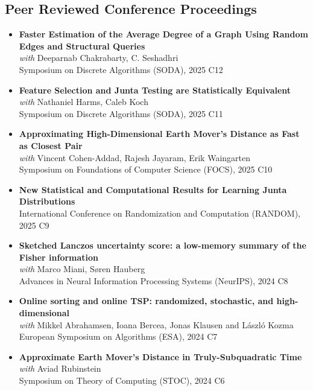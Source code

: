 \documentclass[paper=a4,fontsize=11pt]{article} %
\begin{document}
\subsection*{Peer Reviewed Conference Proceedings}
\begin{itemize}[leftmargin=0.5em,itemsep=0.3em,label={}]
    \item \textbf{Faster Estimation of the Average Degree of a Graph Using Random Edges and Structural Queries}\\ 
  \textit{with} Deeparnab Chakrabarty, C. Seshadhri \\
  Symposium on Discrete Algorithms (SODA), 2025 \hfill C12

    \item \textbf{Feature Selection and Junta Testing are Statistically Equivalent}\\ 
  \textit{with} Nathaniel Harms, Caleb Koch  \\
  Symposium on Discrete Algorithms (SODA), 2025 \hfill C11

    \item \textbf{Approximating High-Dimensional Earth Mover's Distance as Fast as Closest Pair}\\ 
  \textit{with} Vincent Cohen-Addad, Rajesh Jayaram, Erik Waingarten \\
    Symposium on Foundations of Computer Science (FOCS), 2025 \hfill C10
    
    \item \textbf{New Statistical and Computational Results for Learning Junta Distributions}\\ 
    International Conference on Randomization and Computation (RANDOM), 2025 \hfill C9
    
    \item \textbf{Sketched Lanczos uncertainty score: a low-memory summary of the Fisher information}\\ 
  \textit{with} Marco Miani, Søren Hauberg \\
    Advances in Neural Information Processing Systems (NeurIPS), 2024 \hfill C8

    \item \textbf{Online sorting and online TSP: randomized, stochastic, and high-dimensional}\\ 
    \textit{with} Mikkel Abrahamsen, Ioana Bercea, Jonas Klausen and László Kozma \\
    European Symposium on Algorithms (ESA), 2024 \hfill C7
    
    \item \textbf{Approximate Earth Mover's Distance in Truly-Subquadratic Time} \\ 
    \textit{with} Aviad Rubinstein \\
    Symposium on Theory of Computing (STOC), 2024 \hfill C6
    

\end{itemize}
\end{document}
